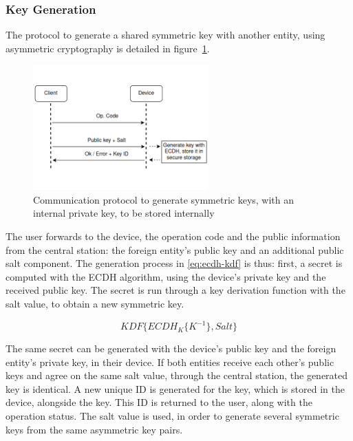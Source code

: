 \subsubsection{Key Generation}\label{chap:arch:services:new-comms:ecdh}

The protocol to generate a shared symmetric key with another entity, using asymmetric cryptography is detailed in figure~\ref{fig:protocol:ecdh}.
\begin{figure}[h!]
	\centering
	\includegraphics[width=0.60\textwidth]{./Images/ecdh.png}
	\caption{Communication protocol to generate symmetric keys, with an internal private key, to be stored internally}
	\label{fig:protocol:ecdh}
\end{figure}

The user forwards to the device, the operation code and the public information from the central station: the foreign entity's public key and an additional public salt component.
The generation process in \ref{eq:ecdh-kdf} is thus: first, a secret is computed with the \ac{ECDH} algorithm, using the device's private key and the received public key. The secret is run through a key derivation function with the salt value, to obtain a new symmetric key.

\begin{equation}
	\label{eq:ecdh-kdf}
	KDF\{ECDH_{K}\{K^{-1}\}, Salt\}
\end{equation}

The same secret can be generated with the device's public key and the foreign entity's private key, in their device. If both entities receive each other's public keys and agree on the same salt value, through the central station, the generated key is identical.
A new unique ID is generated for the key, which is stored in the device, alongside the key. This ID is returned to the user, along with the operation status.
The salt value is used, in order to generate several symmetric keys from the same asymmetric key pairs.


